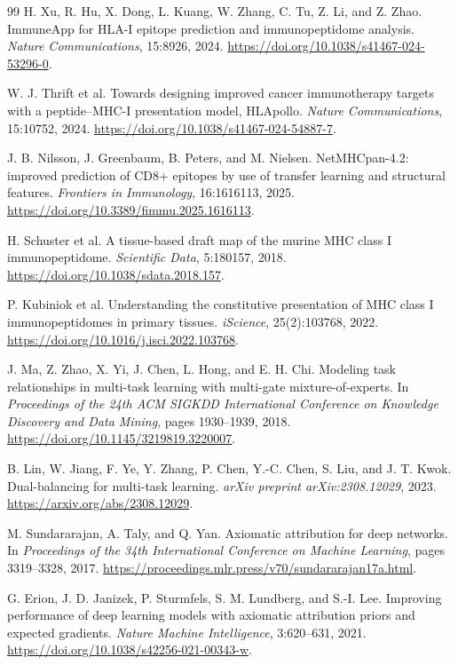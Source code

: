 \begin{thebibliography}{99}
H. Xu, R. Hu, X. Dong, L. Kuang, W. Zhang, C. Tu, Z. Li, and Z. Zhao.
\newblock ImmuneApp for HLA-I epitope prediction and immunopeptidome analysis.
\newblock \emph{Nature Communications}, 15:8926, 2024.
\newblock \url{https://doi.org/10.1038/s41467-024-53296-0}.

W. J. Thrift et al.
\newblock Towards designing improved cancer immunotherapy targets with a peptide--MHC-I presentation model, HLApollo.
\newblock \emph{Nature Communications}, 15:10752, 2024.
\newblock \url{https://doi.org/10.1038/s41467-024-54887-7}.

J. B. Nilsson, J. Greenbaum, B. Peters, and M. Nielsen.
\newblock NetMHCpan-4.2: improved prediction of CD8+ epitopes by use of transfer learning and structural features.
\newblock \emph{Frontiers in Immunology}, 16:1616113, 2025.
\newblock \url{https://doi.org/10.3389/fimmu.2025.1616113}.

H. Schuster et al.
\newblock A tissue-based draft map of the murine MHC class I immunopeptidome.
\newblock \emph{Scientific Data}, 5:180157, 2018.
\newblock \url{https://doi.org/10.1038/sdata.2018.157}.

P. Kubiniok et al.
\newblock Understanding the constitutive presentation of MHC class I immunopeptidomes in primary tissues.
\newblock \emph{iScience}, 25(2):103768, 2022.
\newblock \url{https://doi.org/10.1016/j.isci.2022.103768}.

J. Ma, Z. Zhao, X. Yi, J. Chen, L. Hong, and E. H. Chi.
\newblock Modeling task relationships in multi-task learning with multi-gate mixture-of-experts.
\newblock In \emph{Proceedings of the 24th ACM SIGKDD International Conference on Knowledge Discovery and Data Mining}, pages 1930--1939, 2018.
\newblock \url{https://doi.org/10.1145/3219819.3220007}.

B. Lin, W. Jiang, F. Ye, Y. Zhang, P. Chen, Y.-C. Chen, S. Liu, and J. T. Kwok.
\newblock Dual-balancing for multi-task learning.
\newblock \emph{arXiv preprint arXiv:2308.12029}, 2023.
\newblock \url{https://arxiv.org/abs/2308.12029}.

M. Sundararajan, A. Taly, and Q. Yan.
\newblock Axiomatic attribution for deep networks.
\newblock In \emph{Proceedings of the 34th International Conference on Machine Learning}, pages 3319--3328, 2017.
\newblock \url{https://proceedings.mlr.press/v70/sundararajan17a.html}.

G. Erion, J. D. Janizek, P. Sturmfels, S. M. Lundberg, and S.-I. Lee.
\newblock Improving performance of deep learning models with axiomatic attribution priors and expected gradients.
\newblock \emph{Nature Machine Intelligence}, 3:620--631, 2021.
\newblock \url{https://doi.org/10.1038/s42256-021-00343-w}.

\end{thebibliography}
\endgroup